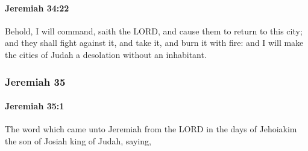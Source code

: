 		\paragraph{Jeremiah 34:22} %
			\label{JEREMIAH-34-22}

			Behold, I will command, saith the LORD, and cause them to return to this city; and they shall fight against it, and take it, and burn it with fire: and I will make the cities of Judah a desolation without an inhabitant.

	\subsubsection{Jeremiah 35} %
		\label{JEREMIAH-35}

		\paragraph{Jeremiah 35:1} %
			\label{JEREMIAH-35-1}

			The word which came unto Jeremiah from the LORD in the days of Jehoiakim the son of Josiah king of Judah, saying,


